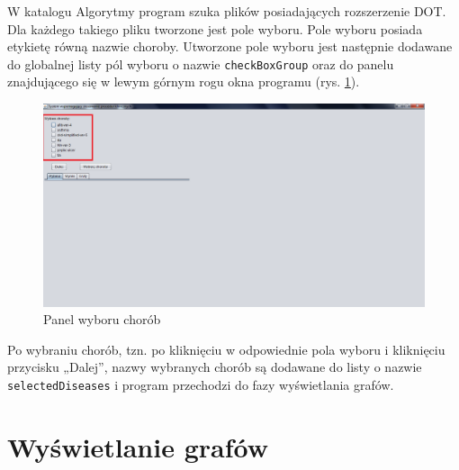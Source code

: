 W katalogu Algorytmy program szuka plików posiadających rozszerzenie DOT. Dla każdego takiego pliku tworzone jest pole wyboru. Pole wyboru posiada etykietę równą nazwie choroby. 
Utworzone pole wyboru jest następnie dodawane do globalnej listy pól wyboru o nazwie \texttt{checkBoxGroup} oraz do panelu 
znajdującego się w lewym górnym rogu okna programu (rys. \ref{fig:wybor_chorob}). 
\begin{figure}[H]
\centering
\includegraphics[width=\textwidth]{img/wybor_chorob.png}
\caption{Panel wyboru chorób}
\label{fig:wybor_chorob}
\end{figure}
Po wybraniu chorób, tzn. po kliknięciu w odpowiednie pola wyboru i kliknięciu przycisku „Dalej”, nazwy wybranych chorób są dodawane do listy o nazwie \texttt{selectedDiseases} i program przechodzi do fazy wyświetlania grafów. 

\section{Wyświetlanie grafów}


